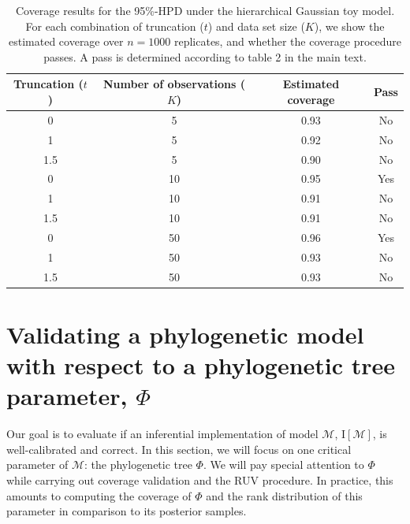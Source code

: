 \documentclass[oneside]{article}
\begin{document}
\begin{table}[!h]
\caption{Coverage results for the 95\%-HPD under the hierarchical Gaussian toy model.
For each combination of truncation ($t$) and data set size ($K$), we show the estimated coverage over $n=1000$ replicates, and whether the coverage procedure passes.
A pass is determined according to table 2 in the main text.
}
\centering
\begin{tabular}{cccc}
  \hline
  Truncation ($t$) & Number of observations ($K$) & Estimated coverage & Pass \\
  \hline
  \rowcolor{gray!10} 0   & 5                      & 0.93               & No     \\
  \rowcolor{gray!10} 1   & 5                      & 0.92               & No     \\
  \rowcolor{gray!10} 1.5 & 5                      & 0.90               & No     \\
                     0   & 10                     & 0.95               & Yes    \\
                     1   & 10                     & 0.91               & No     \\
                     1.5 & 10                     & 0.91               & No     \\
  \rowcolor{gray!10} 0   & 50                     & 0.96               & Yes    \\
  \rowcolor{gray!10} 1   & 50                     & 0.93               & No     \\
  \rowcolor{gray!10} 1.5 & 50                     & 0.93               & No     \\
  \hline
\end{tabular}
\label{suptab:ruv_normal_toy}
\end{table}

\newpage
\section{Validating a phylogenetic model with respect to a phylogenetic tree parameter, $\Phi$}
\label{sec::app::ruv_topology}

Our goal is to evaluate if an inferential implementation of model $\mathcal{M}$, $\text{I}[\mathcal{M}]$, is well-calibrated and correct.
In this section, we will focus on one critical parameter of $\mathcal{M}$: the phylogenetic tree $\Phi$.
We will pay special attention to $\Phi$ while carrying out coverage validation and the RUV procedure.
In practice, this amounts to computing the coverage of $\Phi$ and the rank distribution of this parameter in comparison to its posterior samples.
\end{document}
